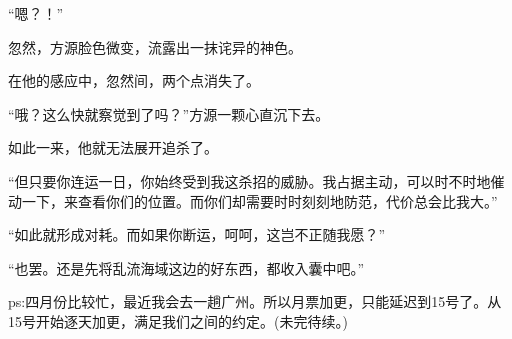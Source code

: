 \begin{this_body}
“嗯？！”

忽然，方源脸色微变，流露出一抹诧异的神色。

在他的感应中，忽然间，两个点消失了。

“哦？这么快就察觉到了吗？”方源一颗心直沉下去。

如此一来，他就无法展开追杀了。

“但只要你连运一日，你始终受到我这杀招的威胁。我占据主动，可以时不时地催动一下，来查看你们的位置。而你们却需要时时刻刻地防范，代价总会比我大。”

“如此就形成对耗。而如果你断运，呵呵，这岂不正随我愿？”

“也罢。还是先将乱流海域这边的好东西，都收入囊中吧。”

ps:四月份比较忙，最近我会去一趟广州。所以月票加更，只能延迟到15号了。从15号开始逐天加更，满足我们之间的约定。(未完待续。)

\end{this_body}

